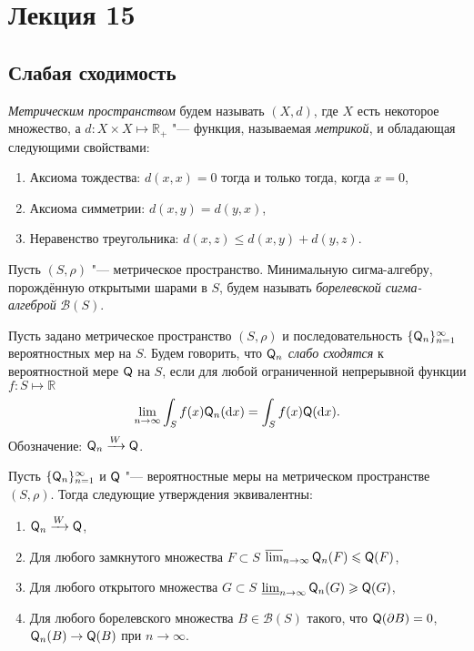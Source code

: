 
\section{Лекция 15}
\subsection{Слабая сходимость}
\begin{definition}
	\emph{Метрическим пространством} будем называть $(X, d)$, где $X$ есть некоторое множество, а $d \colon X \times X \mapsto \mathbb{R}_{+}$ "--- функция, называемая \emph{метрикой}, и обладающая следующими свойствами:
	\begin{enumerate}[label=\alph*)]
		\item Аксиома тождества: $d(x, x) = 0$ тогда и только тогда, когда $x = 0$,
		\item Аксиома симметрии: $d(x, y) = d(y, x)$,
		\item Неравенство треугольника: $d(x, z) \leq d(x, y) + d(y, z)$.
	\end{enumerate}
\end{definition}
\begin{definition}
	Пусть $(S, \rho)$ "--- метрическое пространство. Минимальную сигма-алгебру, порождённую открытыми шарами в $S$, будем называть \emph{борелевской сигма-алгеброй} $\mathcal{B}(S)$.
\end{definition}
\begin{definition}
	Пусть задано метрическое пространство $(S, \rho)$ и последовательность $\{\mathsf{Q}_{n}\}_{n = 1}^{\infty}$ вероятностных мер на $S$. Будем говорить, что $\mathsf{Q}_{n}$ \emph{слабо сходятся} к вероятностной мере $\mathsf{Q}$ на $S$, если для любой ограниченной непрерывной функции $f \colon S \mapsto \mathbb{R}$
	\begin{equation}
		\lim_{n \to \infty} \int_{S} f(x)\mathsf{Q}_{n}(\dd x) = \int_{S} f(x)\mathsf{Q}(\dd x).  
	\end{equation}
	Обозначение: $\mathsf{Q}_{n} \xrightarrow{W} \mathsf{Q}$.
\end{definition}
\begin{theorem}[Александров]
	Пусть $\{\mathsf{Q}_{n}\}_{n = 1}^{\infty}$ и $\mathsf{Q}$ "--- вероятностные меры на метрическом пространстве $(S, \rho)$. Тогда следующие утверждения эквивалентны:
	\begin{enumerate}[label=\alph*)]
		\item $\mathsf{Q}_{n} \xrightarrow{W} \mathsf{Q}$,
		\item Для любого замкнутого множества $F \subset S$ $\varlimsup_{n \to \infty} \mathsf{Q}_{n}(F) \leqslant \mathsf{Q}(F)$,
		\item Для любого открытого множества $G \subset S$ $\varliminf_{n \to \infty} \mathsf{Q}_{n}(G) \geqslant \mathsf{Q}(G)$,
		\item Для любого борелевского множества $B \in \mathcal{B}(S)$ такого, что $\mathsf{Q}(\partial B) = 0$, $\mathsf{Q}_{n}(B) \to \mathsf{Q}(B)$ при $n \to \infty$.
	\end{enumerate}
\end{theorem}
